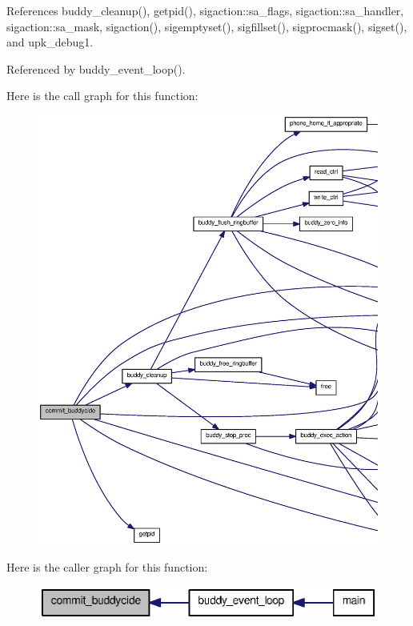 References buddy\_\-cleanup(), getpid(), sigaction::sa\_\-flags, sigaction::sa\_\-handler, sigaction::sa\_\-mask, sigaction(), sigemptyset(), sigfillset(), sigprocmask(), sigset(), and upk\_\-debug1.



Referenced by buddy\_\-event\_\-loop().



Here is the call graph for this function:
\nopagebreak
\begin{figure}[H]
\begin{center}
\leavevmode
\includegraphics[width=400pt]{buddy_8c_ab7a98a53dac20e00f111f46389698b1d_cgraph}
\end{center}
\end{figure}




Here is the caller graph for this function:\nopagebreak
\begin{figure}[H]
\begin{center}
\leavevmode
\includegraphics[width=348pt]{buddy_8c_ab7a98a53dac20e00f111f46389698b1d_icgraph}
\end{center}
\end{figure}


